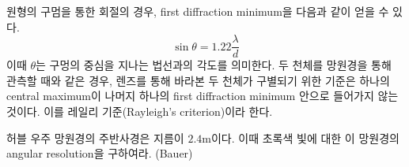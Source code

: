 원형의 구멈을 통한 회절의 경우, first diffraction minimum을 다음과 같이 얻을 수 있다.
\begin{equation}
\sin\theta=1.22\frac{\lambda}{d}
\end{equation}
이때 $\theta$는 구멍의 중심을 지나는 법선과의 각도를 의미한다. 두 천체를 망원경을 통해 관측할 때와 같은 경우, 렌즈를 통해 바라본 두 천체가 구별되기 위한 기준은 하나의 central maximum이 나머지 하나의 first diffraction minimum 안으로 들어가지 않는 것이다. 이를 레일리 기준(Rayleigh's criterion)이라 한다.

\begin{exercise}
허블 우주 망원경의 주반사경은 지름이 $2.4\mathrm{m}$이다. 이때 초록색 빛에 대한 이 망원경의 angular resolution을 구하여라. (Bauer)
\end{exercise}



